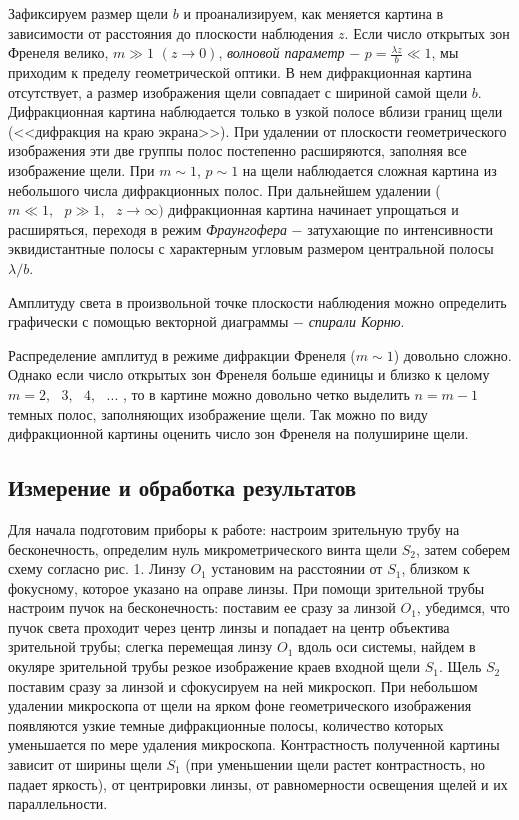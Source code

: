 \documentclass[a4paper,12pt]{article} %
\begin{document}
\hfill \break Зафиксируем размер щели $b$ и проанализируем, как меняется картина в зависимости от расстояния до плоскости наблюдения $z$. Если число открытых зон Френеля велико, $m \gg 1$ $ (z \rightarrow 0)$, \textit{волновой параметр} $-$ $p = \frac{\lambda z} {b} \ll 1$, мы приходим к пределу геометрической оптики. В нем дифракционная картина отсутствует, а размер изображения щели совпадает с шириной самой щели $b$. Дифракционная картина наблюдается только в узкой полосе вблизи границ щели (<<дифракция на краю экрана>>). При удалении от плоскости геометрического изображения эти две группы полос постепенно расширяются, заполняя все изображение щели. При $m \sim 1$, $p \sim 1$ на щели наблюдается сложная картина из небольшого числа дифракционных полос. При дальнейшем удалении ($m \ll 1, \text{ } p \gg 1, \text{ } z \rightarrow \infty)$ дифракционная картина начинает упрощаться и расширяться, переходя в режим \textit{Фраунгофера} $-$ затухающие по интенсивности эквидистантные полосы с характерным угловым размером центральной полосы $\lambda / b$.

\hfill \break Амплитуду света в произвольной точке плоскости наблюдения можно определить графически с помощью векторной диаграммы $-$ \textit{спирали Корню}.

\hfill \break Распределение амплитуд в режиме дифракции Френеля ($m \sim 1$) довольно сложно. Однако если число открытых зон Френеля больше единицы и близко к целому $m = 2, \text{ } 3, \text{ } 4, \text{ } ...$ , то в картине можно довольно четко выделить $n = m - 1$ темных полос, заполняющих изображение щели. Так можно по виду дифракционной картины оценить число зон Френеля на полуширине щели. 

\subsection{Измерение и обработка результатов}
\hfill \break Для начала подготовим приборы к работе: настроим зрительную трубу на бесконечность, определим нуль микрометрического винта щели $S_2$, затем соберем схему согласно рис. 1. Линзу $O_1$ установим на расстоянии от $S_1$, близком к фокусному, которое указано на оправе линзы. При помощи зрительной трубы настроим пучок на бесконечность: поставим ее сразу за линзой $O_1$, убедимся, что пучок света проходит через центр линзы и попадает на центр объектива зрительной трубы; слегка перемещая линзу $O_1$ вдоль оси системы, найдем в окуляре зрительной трубы резкое изображение краев входной щели $S_1$. Щель $S_2$ поставим сразу за линзой и сфокусируем на ней микроскоп. При небольшом удалении микроскопа от щели на ярком фоне геометрического изображения появляются узкие темные дифракционные полосы, количество которых уменьшается по мере удаления микроскопа. Контрастность полученной картины зависит от ширины щели $S_1$ (при уменьшении щели растет контрастность, но падает яркость), от центрировки линзы, от равномерности освещения щелей и их параллельности.
\end{document}
